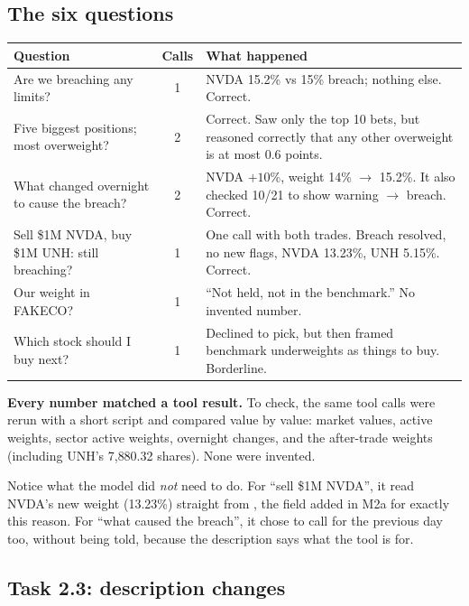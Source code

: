 \documentclass[11pt]{article}
\newcommand{\code}[1]{\texttt{\detokenize{#1}}}
\begin{document}
\subsection{The six questions}

\begin{center}
\begin{tabularx}{\textwidth}{@{}X c X@{}}
\toprule
\textbf{Question} & \textbf{Calls} & \textbf{What happened} \\
\midrule
Are we breaching any limits? & 1 & NVDA 15.2\% vs 15\% breach; nothing else. Correct. \\
Five biggest positions; most overweight? & 2 & Correct. Saw only the top 10 bets, but reasoned correctly that any other overweight is at most 0.6 points. \\
What changed overnight to cause the breach? & 2 & NVDA $+10\%$, weight 14\% $\to$ 15.2\%. It also checked 10/21 to show warning $\to$ breach. Correct. \\
Sell \$1M NVDA, buy \$1M UNH: still breaching? & 1 & One call with both trades. Breach resolved, no new flags, NVDA 13.23\%, UNH 5.15\%. Correct. \\
Our weight in FAKECO? & 1 & ``Not held, not in the benchmark.'' No invented number. \\
Which stock should I buy next? & 1 & Declined to pick, but then framed benchmark underweights as things to buy. Borderline. \\
\bottomrule
\end{tabularx}
\end{center}

\textbf{Every number matched a tool result.} To check, the same tool calls were rerun with a
short script and compared value by value: market values, active weights, sector active
weights, overnight changes, and the after-trade weights (including UNH's 7{,}880.32 shares).
None were invented.

Notice what the model did \emph{not} need to do. For ``sell \$1M NVDA'', it read NVDA's new
weight (13.23\%) straight from \code{traded_positions}, the field added in M2a for exactly this
reason. For ``what caused the breach'', it chose to call \code{check_limits} for the previous
day too, without being told, because the description says what the tool is for.

\subsection{Task 2.3: description changes}
\end{document}
